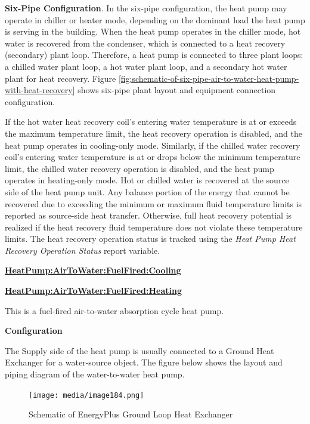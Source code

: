 \textbf{Six-Pipe Configuration}. In the six-pipe configuration, the heat pump may operate in chiller or heater mode, depending on the dominant load the heat pump is serving in the building. When the heat pump operates in the chiller mode, hot water is recovered from the condenser, which is connected to a heat recovery (secondary) plant loop. Therefore, a heat pump is connected to three plant loops: a chilled water plant loop, a hot water plant loop, and a secondary hot water plant for heat recovery.  Figure \ref{fig:schematic-of-six-pipe-air-to-water-heat-pump-with-heat-recovery} shows six-pipe plant layout and equipment connection configuration.


If the hot water heat recovery coil's entering water temperature is at or exceeds the maximum temperature limit, the heat recovery operation is disabled, and the heat pump operates in cooling-only mode. Similarly, if the chilled water recovery coil's entering water temperature is at or drops below the minimum temperature limit, the chilled water recovery operation is disabled, and the heat pump operates in heating-only mode. Hot or chilled water is recovered at the source side of the heat pump unit. Any balance portion of the energy that cannot be recovered due to exceeding the minimum or maximum fluid temperature limits is reported as source-side heat transfer. Otherwise, full heat recovery potential is realized if the heat recovery fluid temperature does not violate these temperature limits. The heat recovery operation status is tracked using the \textit{Heat Pump Heat Recovery Operation Status} report variable.




\textbf{\hyperref[plhp_fuelfired]{HeatPump:AirToWater:FuelFired:Cooling}}

\textbf{\hyperref[plhp_fuelfired]{HeatPump:AirToWater:FuelFired:Heating}}

This is a fuel-fired air-to-water absorption cycle heat pump.


\textbf{Configuration}

The Supply side of the heat pump is usually connected to a Ground Heat Exchanger for a water-source object. The figure below shows the layout and piping diagram of the water-to-water heat pump.

\begin{figure}[hbtp] %
    \centering
    \texttt{[image: media/image184.png]}
    \caption{Schematic of EnergyPlus Ground Loop Heat Exchanger \protect \label{fig:schematic-of-energyplus-ground-loop-heat-001}}
\end{figure}

